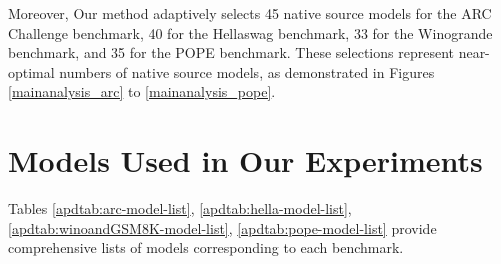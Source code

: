 Moreover, Our method adaptively selects 45 native source models for the ARC Challenge benchmark, 40 for the Hellaswag benchmark, 33 for the Winogrande benchmark, and 35 for the POPE benchmark. These selections represent near-optimal numbers of native source models, as demonstrated in Figures \ref{mainanalysis_arc} to \ref{mainanalysis_pope}.
\label{apd:main_analysis}





\section{Models Used in Our Experiments}
\label{apd:modellist}
Tables \ref{apdtab:arc-model-list}, \ref{apdtab:hella-model-list}, \ref{apdtab:winoandGSM8K-model-list}, \ref{apdtab:pope-model-list} provide comprehensive lists of models corresponding to each benchmark.
